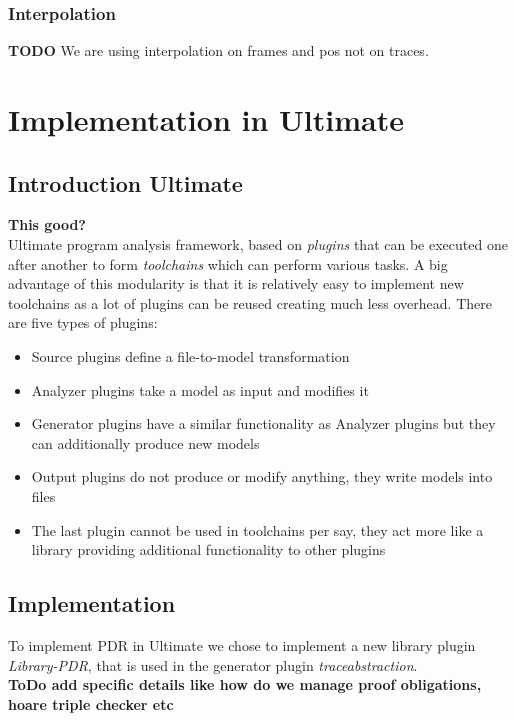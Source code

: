 \documentclass[11pt, a4paper, BCOR=10mm, ngerman, oneside]{scrbook}
\begin{document}
\subsection{Interpolation}
\textbf{TODO}
We are using interpolation on frames and pos not on traces.

\pagebreak


\chapter{Implementation in Ultimate}
\section{Introduction Ultimate}
\textbf{This good?} \\
Ultimate program analysis framework, based on \textsl{plugins} that can be executed one after another to form \textsl{toolchains} which can perform various tasks. A big advantage of this modularity is that it is relatively easy to implement new toolchains as a lot of plugins can be reused creating much less overhead. There are five types of plugins: 
\begin{itemize}
\item Source plugins define a file-to-model transformation

\item  Analyzer plugins take a model as input and modifies it

\item Generator plugins have a similar functionality as Analyzer plugins but they can additionally produce new models

\item Output plugins do not produce or modify anything, they write models into files

\item The last plugin cannot be used in toolchains per say, they act more like a library providing additional functionality to other plugins

\end{itemize}

\section{Implementation}
To implement PDR in Ultimate we chose to implement a new library plugin \textsl{Library-PDR}, that is used in the generator plugin \textsl{traceabstraction}. \\
\textbf{ToDo add specific details like how do we manage proof obligations, hoare triple checker etc}
\end{document}
